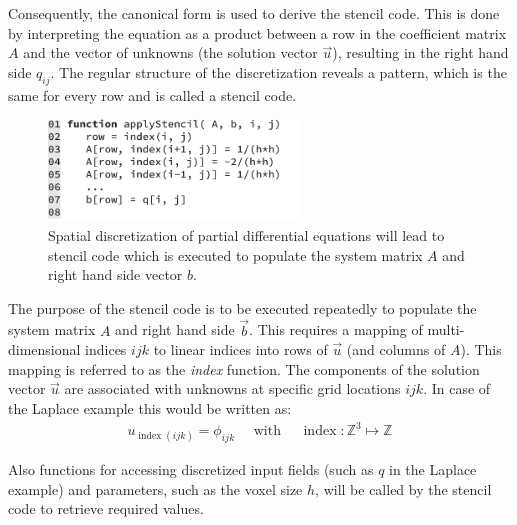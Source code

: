 Consequently, the canonical form is used to derive the stencil code. This is done by interpreting the equation as a product between a row in the coefficient matrix $A$ and the vector of unknowns (the solution vector $\vec{u}$), resulting in the right hand side $q_{ij}$. The regular structure of the discretization reveals a pattern, which is the same for every row and is called a stencil code.

\begin{figure}[h]
\centering
\includegraphics[width=0.6\textwidth]{04_pn_method/figures/fig_code_stencil.pdf}
\caption{Spatial discretization of partial differential equations will lead to stencil code which is executed to populate the system matrix $A$ and right hand side vector $b$.}
\label{fig:pn_solver_stencil_code}
\end{figure}

The purpose of the stencil code is to be executed repeatedly to populate the system matrix $A$ and right hand side $\vec{b}$. This requires a mapping of multi-dimensional indices $ijk$ to linear indices into rows of $\vec{u}$ (and columns of $A$). This mapping is referred to as the \emph{index} function. The components of the solution vector $\vec{u}$ are associated with unknowns at specific grid locations $ijk$. In case of the Laplace example this would be written as:
\begin{align}
u_{\operatorname{index}\left(ijk\right)} = \phi_{ijk}\quad\text{ with }\quad \operatorname{index}: \mathbb{Z}^3\mapsto\mathbb{Z}
\label{eq:pn_index_mapping}
\end{align}

Also functions for accessing discretized input fields (such as $q$ in the Laplace example) and parameters, such as the voxel size $h$, will be called by the stencil code to retrieve required values.

